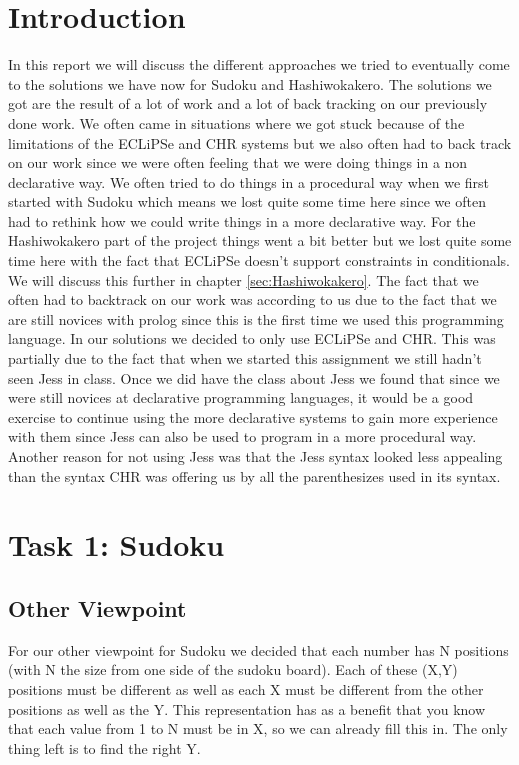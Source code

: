 \documentclass{report}
\newcommand{\mychapter}[2]{
    \setcounter{chapter}{#1}
    \setcounter{section}{0}
    \chapter*{#2}
    \addcontentsline{toc}{chapter}{#2}
}
\begin{document}
\newpage
\tableofcontents
\newpage

\mychapter{0}{Introduction}
In this report we will discuss the different approaches we tried to eventually come to the solutions we have now for Sudoku and Hashiwokakero. The solutions we got are the result of a lot of work and a lot of back tracking on our previously done work. We often came in situations where we got stuck because of the limitations of the ECLiPSe and CHR systems but we also often had to back track on our work since we were often feeling that we were doing things in a non declarative way. We often tried to do things in a procedural way when we first started with Sudoku which means we lost quite some time here since we often had to rethink how we could write things in a more declarative way. For the Hashiwokakero part of the project things went a bit better but we lost quite some time here with the fact that ECLiPSe doesn't support constraints in conditionals. We will discuss this further in chapter \ref{sec:Hashiwokakero}. The fact that we often had to backtrack on our work was according to us due to the fact that we are still novices with prolog since this is the first time we used this programming language.
	\newline
	\newline
	In our solutions we decided to only use ECLiPSe and CHR. This was partially due to the fact that when we started this assignment we still hadn't seen Jess in class. Once we did have the class about Jess we found that since we were still novices at declarative programming languages, it would be a good exercise to continue using the more declarative systems to gain more experience with them since Jess can also be used to program in a more procedural way. Another reason for not using Jess was that the Jess syntax looked less appealing than the syntax CHR was offering us by all the parenthesizes used in its syntax.
	
\mychapter{1}{Task 1: Sudoku}
\section{Other Viewpoint}
\label{sec:other_viewpoint}
For our other viewpoint for Sudoku we decided that each number has N positions (with N the size from one side of the sudoku board). Each of these (X,Y) positions must be different as well as each X must be different from the other positions as well as the Y. This representation has as a benefit that you know that each value from 1 to N must be in X, so we can already fill this in. The only thing left is to find the right Y.
\newline
\newline
\end{document}
